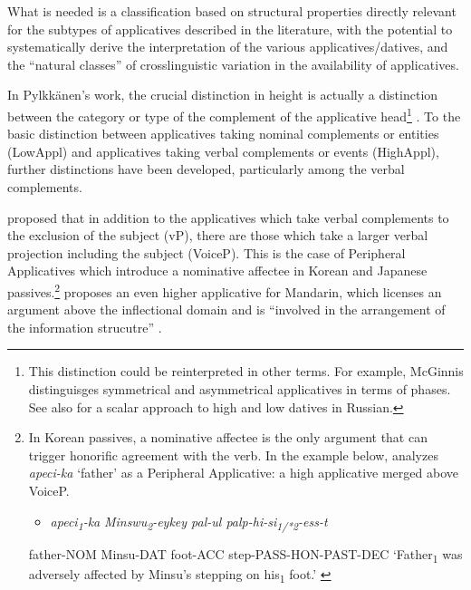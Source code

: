 \documentclass[output=paper,modfonts,nonflat]{langsci/langscibook}
\begin{document}
What is needed is a classification based on structural properties directly relevant for the subtypes of applicatives described in the literature, with the potential to systematically derive the interpretation of the various applicatives/datives, and the “natural classes” of crosslinguistic variation in the availability of applicatives.

In Pylkkänen’s work, the crucial distinction in height is actually a distinction between the category or type of the complement of the applicative head\footnote{This distinction could be reinterpreted in other terms. For example, McGinnis distinguisges symmetrical and asymmetrical applicatives in terms of phases. See also \citet{BonehNash2017} for a scalar approach to high and low datives in Russian.} . To the basic distinction between applicatives taking nominal complements or entities (LowAppl) and applicatives taking verbal complements or events (HighAppl), further distinctions have been developed, particularly among the verbal complements. 

\citet{Kim2011} proposed that in addition to the applicatives which take verbal complements to the exclusion of the subject (vP), there are those which take a larger verbal projection including the subject (VoiceP). This is the case of Peripheral Applicatives which introduce a nominative affectee in Korean and Japanese passives.\footnote{In Korean passives, a nominative affectee is the only argument that can trigger honorific agreement with the verb. In the example below, \citet{Kim2012} analyzes \textit{apeci-ka} ‘father’ as a Peripheral Applicative: a high applicative merged above VoiceP.

\begin{itemize}
\item \begin{styleFootnote}
\textit{apeci\textsubscript{1}}\textit{{}-ka}       \textit{Minswu\textsubscript{2}}\textit{{}-eykey   pal-ul       palp-hi-si}\textit{\textsubscript{1/*2}}\textit{{}-ess-t}
\end{styleFootnote}
\end{itemize}
  father-NOM  Minsu-DAT       foot-ACC   step-PASS-HON-PAST-DEC  ‘Father\textsubscript{1} was adversely affected by Minsu’s stepping on his\textsubscript{1} foot.’   \citep{Kim2012}} \citet{Tsai2018} proposes an even higher applicative for Mandarin, which licenses an argument above the inflectional domain and is “involved in the arrangement of the information strucutre” \citep[18]{Tsai2018}. 
\end{document}
